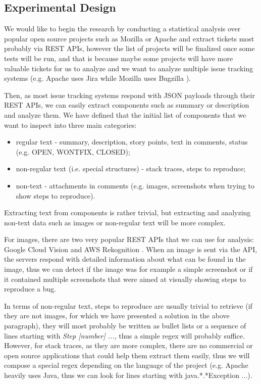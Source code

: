 \documentclass{mprop}
\begin{document}
\subsection{Experimental Design}

We would like to begin the research by conducting a statistical analysis 
over popular open source projects such as Mozilla or Apache and extract 
tickets most probably via REST APIs, however the list of projects
will be finalized once some tests will be run, and that is because
maybe some projects will have more valuable tickets for us to analyze and
we want to analyze multiple issue tracking systems 
(e.g. Apache uses Jira \citep{jira} while Mozilla uses Bugzilla 
\citep{bugzilla}). 

Then, as most issue tracking systems respond with JSON payloads through 
their REST APIs, we can easily extract components such as summary or 
description and analyze them. We have defined that the initial list of 
components that we want to inspect into three main categories:
  \begin{itemize}
    \item regular text - summary, description, story points, 
      text in comments, status (e.g. OPEN, WONTFIX, CLOSED);
    \item non-regular text (i.e. special structures) - stack traces,
      steps to reproduce;
    \item non-text - attachments in comments (e.g. images, screenshots
      when trying to show steps to reproduce).
  \end{itemize}

Extracting text from components is rather trivial, but extracting and 
analyzing non-text data such as images or non-regular text will be 
more complex. 

For images, there are two very popular REST APIs that 
we can use for analysis: Google Cloud Vision \citep{vision} and 
AWS Rekognition \citep{rekognition}. When an image is sent via the API,
the servers respond with detailed information about what can be found
in the image, thus we can detect if the image was for example a 
simple screenshot or if it contained multiple screenshots that were aimed
at visually showing steps to reproduce a bug.

In terms of non-regular text, steps to reproduce are usually trivial to
retrieve (if they are not images, for which we have presented a solution
in the above paragraph), they will most probably be written as bullet
lists or a sequence of lines starting with \emph{Step [number] ...}, thus
a simple regex will probably suffice. However, for stack traces, as they
are more complex, there are no commercial or open source applications
that could help them extract them easily, thus we will compose a special
regex depending on the language of the project (e.g. Apache heavily 
uses Java, thus we can look for lines starting with java.*.*Exception ...).
\end{document}
